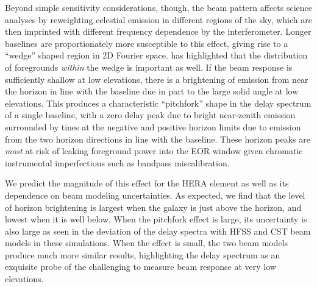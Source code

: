 \documentclass{emulateapj}
\begin{document}
Beyond simple sensitivity considerations, though, the beam pattern affects science analyses by reweighting celestial emission in different regions of the sky, which are then imprinted with different frequency dependence by the interferometer. Longer baselines are proportionately more susceptible to this effect, giving rise to a ``wedge'' shaped region in 2D Fourier space. \citet{nithya15} has highlighted that the distribution of foregrounds \textit{within} the wedge is important as well. If the beam response is sufficiently shallow at low elevations, there is a brightening of emission from near the horizon in line with the baseline due in part to the large solid angle at low elevations. This produces a characteristic ``pitchfork'' shape in the delay spectrum of a single baseline, with a zero delay peak due to bright near-zenith emission surrounded by tines at the negative and positive horizon limits due to emission from the two horizon directions in line with the baseline. These horizon peaks are \textit{most} at risk of leaking foreground power into the EOR window given chromatic instrumental imperfections such as bandpass miscalibration. 

We predict the magnitude of this effect for the HERA element as well as its dependence on beam modeling uncertainties. As expected, we find that the level of horizon brightening is largest when the galaxy is just above the horizon, and lowest when it is well below. When the pitchfork effect is large, its uncertainty is also large as seen in the deviation of the delay spectra with HFSS and CST beam models in these simulations. When the effect is small, the two beam models produce much more similar results, highlighting the delay spectrum as an exquisite probe of the challenging to measure beam response at very low elevations.

\end{document}
